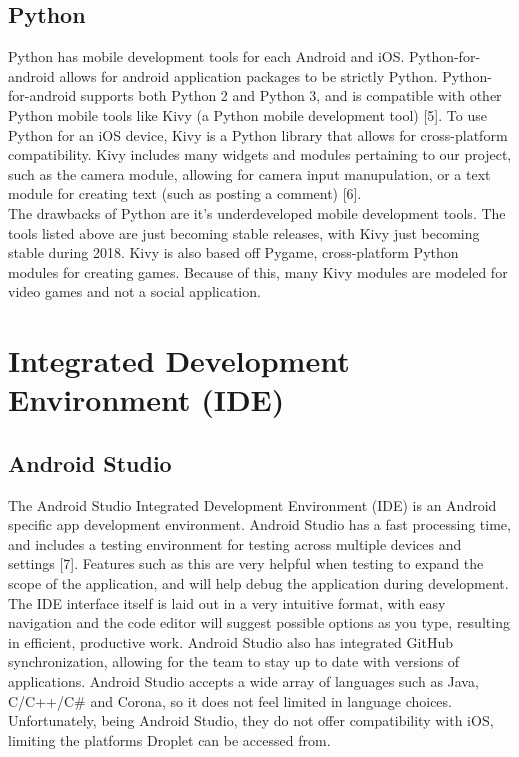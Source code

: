 \documentclass[draftclsnofoot, onecolumn, letterpaper,10pt,compsoc]{IEEEtran}
\begin{document}
\subsection{Python}
Python has mobile development tools for each Android and iOS.  Python-for-android allows for android application packages to be strictly Python.  Python-for-android supports both Python 2 and Python 3, and is compatible with other Python mobile tools like Kivy (a Python mobile development tool) [5].  To use Python for an iOS device, Kivy is a Python library that allows for cross-platform compatibility.  Kivy includes many widgets and modules pertaining to our project, such as the camera module, allowing for  camera input manupulation, or a text module for creating text (such as posting a comment) [6].\\
The drawbacks of Python are it's underdeveloped mobile development tools.  The tools listed above are just becoming stable releases, with Kivy just becoming stable during 2018.  Kivy is also based off Pygame, cross-platform Python modules for creating games.  Because of this, many Kivy modules are modeled for video games and not a social application.
\pagebreak
\section{Integrated Development Environment (IDE)}
\subsection{Android Studio}
The Android Studio Integrated Development Environment (IDE) is an Android specific app development environment.  Android Studio has a fast processing time, and includes a testing environment for testing across multiple devices and settings [7].  Features such as this are very helpful when testing to expand the scope of the application, and will help debug the application during development.  The IDE interface itself is laid out in a very intuitive format, with easy navigation and the code editor will suggest possible options as you type, resulting in efficient, productive work.  Android Studio also has integrated GitHub synchronization, allowing for the team to stay up to date with versions of applications.  Android Studio accepts a wide array of languages such as Java, C/C++/C\# and Corona, so it does not feel limited in language choices.  Unfortunately, being Android Studio, they do not offer compatibility with iOS, limiting the platforms Droplet can be accessed from.
\end{document}
